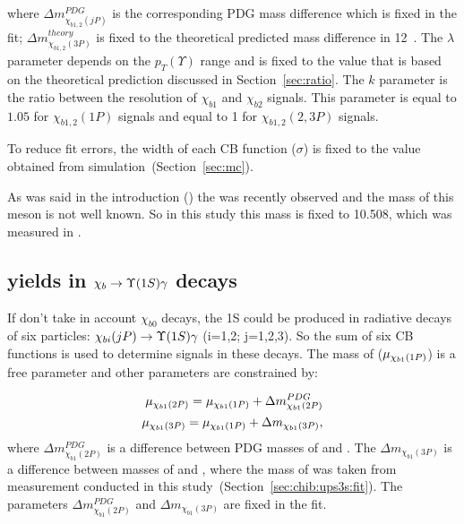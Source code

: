 \noindent where $\Delta m_{\chi_{b1,2}(jP)}^{PDG}$ is the corresponding PDG
mass difference which is fixed in the fit; $\Delta
m_{\chi_{b1,2}(3P)}^{theory}$ is fixed to the theoretical predicted mass
difference in 12\mevcc~\cite{Motyka:1997di}. The $\lambda$ parameter depends on
the $p_T(\Upsilon)$ range and is fixed to the value that is based on the
theoretical prediction discussed in Section~\ref{sec:ratio}. The $k$ parameter
is the ratio between the resolution of $\chi_{b1}$ and $\chi_{b2}$ signals.
This parameter is equal to $1.05$ for $\chi_{b1,2}(1P)$ signals and equal to 1
for $\chi_{b1,2}(2,3P)$ signals.

To reduce fit
errors, the width of each CB function ($\sigma$) is fixed to the value obtained
from simulation~(Section~\ref{sec:mc}).

As was said in the introduction () the \chibThreeP  was
recently observed and the mass of this meson is not well known.
So in this study this mass is fixed to 10.508\gevcc, which was measured in
.

\subsection{\texorpdfstring{\chib}{xb} yields in
\texorpdfstring{$\chib \to \Y1S \gamma$}{xb -> Y\(1S\) gamma } decays}
\label{sec:chib:ups1s:fit}

If don't take in account $\chi_{b0}$ decays, the \Y1S could be produced in radiative decays
of six \chib particles: $\chi_{bi}(jP) \to \Y1S \gamma$ (i=1,2; j=1,2,3). So
the sum of six CB functions is used to determine \chib signals in these decays.
The mass of \chiboneOneP ($\mu_{\chi_{{b} 1}(1P)}$) is a free parameter and  other
parameters are constrained by:

\begin{equation}
  \begin{aligned}
\mu_{\chi_{{b} 1}(2P)} = \mu_{\chi_{{b} 1}(1P)} + \Delta m_{\chi_{b1}(2P)}^{PDG} \\
\mu_{\chi_{{b} 1}(3P)} = \mu_{\chi_{{b} 1}(1P)} + \Delta m_{\chi_{b1}(3P)}, \\
  \end{aligned}
\end{equation}
\noindent where $\Delta m_{\chi_{b1}(2P)}^{PDG}$ is a difference between PDG masses of
\chiboneTwoP and \chiboneOneP. The $\Delta  m_{\chi_{b1}(3P)}$ is a difference
between masses of \chiboneThreeP and \chiboneOneP, where the mass of
\chiboneThreeP was taken from measurement conducted in this
study~(Section~\ref{sec:chib:ups3s:fit}). The parameters  $\Delta
m_{\chi_{b1}(2P)}^{PDG}$ and $\Delta  m_{\chi_{b1}(3P)}$ are fixed in the fit.

